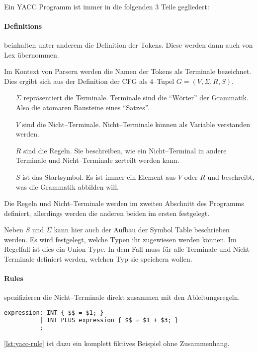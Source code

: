 \paragraph*{}
Ein \ac{YACC} Programm ist immer in die folgenden 3 Teile gegliedert:


\paragraph{Definitions} beinhalten unter anderem die Definition der Tokens.
Diese werden dann auch von Lex übernommen.

Im Kontext von Parsern werden die Namen der Tokens als Terminale bezeichnet.
Dies ergibt sich aus der Definition der \ac{CFG} als 4--Tupel $G=(V,\Sigma,R,S)$.~\autocite{sipser-1997}
\begin{itemize}
    \item[$\Sigma$] repräsentiert die Terminale.
    Terminale sind die \enquote{Wörter} der Grammatik.
    Also die atomaren Bausteine eines \enquote{Satzes}.
    \item[$V$] sind die Nicht--Terminale.
    Nicht--Terminale können als Variable verstanden werden.
    \item[$R$] sind die Regeln.
    Sie beschreiben, wie ein Nicht--Terminal in andere Terminale und Nicht--Terminale zerteilt werden kann.
    \item[$S$] ist das Startsymbol.
    Es ist immer ein Element aus $V$ oder $R$ und beschreibt, was die Grammatik abbilden will.
\end{itemize}
Die Regeln und Nicht--Terminale werden im zweiten Abschnitt des Programms definiert, allerdings werden die anderen beiden im ersten festgelegt.

Neben $S$ und $\Sigma$ kann hier auch der Aufbau der Symbol Table beschrieben werden.
Es wird festgelegt, welche Typen ihr zugewiesen werden können.
Im Regelfall ist dies ein Union Type.
In dem Fall muss für alle Terminale und Nicht--Terminale definiert werden, welchen Typ sie speichern wollen.

\paragraph{Rules} spezifizieren die Nicht--Terminale direkt zusammen mit den Ableitungsregeln.
\begin{lstlisting}[label={lst:yacc-rule},caption={\acs{YACC} Regel},language=yacc]
expression: INT { $$ = $1; }
          | INT PLUS expression { $$ = $1 + $3; }
          ;
\end{lstlisting}
\autoref{lst:yacc-rule} ist dazu ein komplett fiktives Beispiel ohne Zusammenhang.

